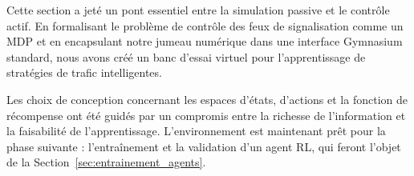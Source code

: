 Cette section a jeté un pont essentiel entre la simulation passive et le contrôle actif. En formalisant le problème de contrôle des feux de signalisation comme un MDP et en encapsulant notre jumeau numérique dans une interface Gymnasium standard, nous avons créé un banc d'essai virtuel pour l'apprentissage de stratégies de trafic intelligentes.

Les choix de conception concernant les espaces d'états, d'actions et la fonction de récompense ont été guidés par un compromis entre la richesse de l'information et la faisabilité de l'apprentissage. L'environnement est maintenant prêt pour la phase suivante : l'entraînement et la validation d'un agent RL, qui feront l'objet de la Section~\ref{sec:entrainement_agents}.